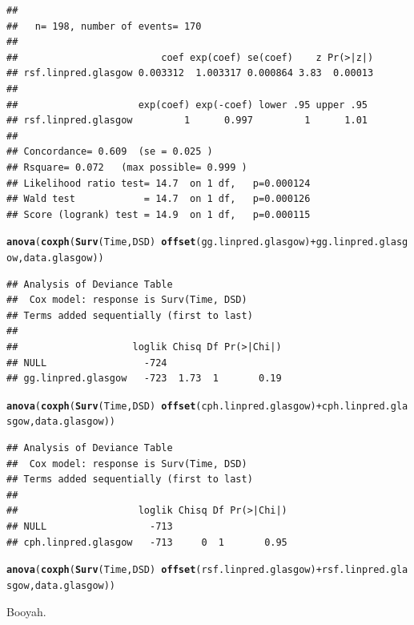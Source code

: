 \documentclass{article}\usepackage[]{graphicx}\usepackage[]{color}
\makeatletter
\newcommand{\hlopt}[1]{\textcolor[rgb]{0,0,0}{#1}}%
\newcommand{\hlstd}[1]{\textcolor[rgb]{0.345,0.345,0.345}{#1}}%
\newcommand{\hlkwd}[1]{\textcolor[rgb]{0.737,0.353,0.396}{\textbf{#1}}}%
\newenvironment{kframe}{%
 \def\at@end@of@kframe{}%
 \ifinner\ifhmode%
  \def\at@end@of@kframe{\end{minipage}}%
  \begin{minipage}{\columnwidth}%
 \fi\fi%
 \def\FrameCommand##1{\hskip\@totalleftmargin \hskip-\fboxsep
 \colorbox{shadecolor}{##1}\hskip-\fboxsep
     \hskip-\linewidth \hskip-\@totalleftmargin \hskip\columnwidth}%
 \MakeFramed {\advance\hsize-\width
   \@totalleftmargin\z@ \linewidth\hsize
   \@setminipage}}%
 {\par\unskip\endMakeFramed%
 \at@end@of@kframe}
\newenvironment{knitrout}{}{} %
\makeatother
\begin{document}
\begin{knitrout}
\begin{kframe}
\begin{verbatim}
## 
##   n= 198, number of events= 170 
## 
##                         coef exp(coef) se(coef)    z Pr(>|z|)
## rsf.linpred.glasgow 0.003312  1.003317 0.000864 3.83  0.00013
## 
##                     exp(coef) exp(-coef) lower .95 upper .95
## rsf.linpred.glasgow         1      0.997         1      1.01
## 
## Concordance= 0.609  (se = 0.025 )
## Rsquare= 0.072   (max possible= 0.999 )
## Likelihood ratio test= 14.7  on 1 df,   p=0.000124
## Wald test            = 14.7  on 1 df,   p=0.000126
## Score (logrank) test = 14.9  on 1 df,   p=0.000115
\end{verbatim}
\begin{alltt}
\hlkwd{anova}\hlstd{(}\hlkwd{coxph}\hlstd{(}\hlkwd{Surv}\hlstd{(Time, DSD)} \hlopt{~} \hlkwd{offset}\hlstd{(gg.linpred.glasgow)} \hlopt{+} \hlstd{gg.linpred.glasgow, data.glasgow))}
\end{alltt}
\begin{verbatim}
## Analysis of Deviance Table
##  Cox model: response is Surv(Time, DSD)
## Terms added sequentially (first to last)
## 
##                    loglik Chisq Df Pr(>|Chi|)
## NULL                 -724                    
## gg.linpred.glasgow   -723  1.73  1       0.19
\end{verbatim}
\begin{alltt}
\hlkwd{anova}\hlstd{(}\hlkwd{coxph}\hlstd{(}\hlkwd{Surv}\hlstd{(Time, DSD)} \hlopt{~} \hlkwd{offset}\hlstd{(cph.linpred.glasgow)} \hlopt{+} \hlstd{cph.linpred.glasgow, data.glasgow))}
\end{alltt}
\begin{verbatim}
## Analysis of Deviance Table
##  Cox model: response is Surv(Time, DSD)
## Terms added sequentially (first to last)
## 
##                     loglik Chisq Df Pr(>|Chi|)
## NULL                  -713                    
## cph.linpred.glasgow   -713     0  1       0.95
\end{verbatim}
\begin{alltt}
\hlkwd{anova}\hlstd{(}\hlkwd{coxph}\hlstd{(}\hlkwd{Surv}\hlstd{(Time, DSD)} \hlopt{~} \hlkwd{offset}\hlstd{(rsf.linpred.glasgow)} \hlopt{+} \hlstd{rsf.linpred.glasgow, data.glasgow))}
\end{alltt}


{\ttfamily\noindent\color{warningcolor}{\#\# Warning in fitter(X, Y, strats, offset, init, control, weights = weights, : Ran out of iterations and did not converge}}

{\ttfamily\noindent\bfseries\color{errorcolor}{\#\# Error in fitter(X, Y, strats, offset, init, control, weights = weights, : NA/NaN/Inf in foreign function call (arg 6)}}\end{kframe}
\end{knitrout}
Booyah.
\end{document}
